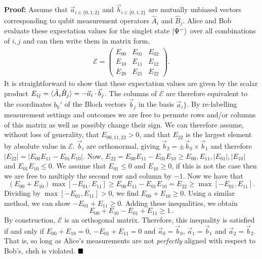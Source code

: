 \vspace{5mm}
\noindent\textbf{Proof:}
Assume that $\vec{a}_{i\in \{0,1,2\}}$ and $\vec{b}_{i\in \{0,1,2\}}$ are mutually unbiased vectors corresponding to qubit measurement operators $\hat{A}_i$ and $\hat{B}_j$. 
Alice and Bob evaluate these expectation values for the singlet state $\mbox{$ | \Psi^- \rangle $}$ over all combinations of $i, j$ and can then write them in matrix form,
\begin{eqnarray}
\label{matrix}
\mathcal{E} = \left(
\begin{array}{ccc}
E_{00} & E_{01} & E_{02} \\
E_{10} & E_{11} & E_{12} \\
E_{20} & E_{21} & E_{22}
\end{array}
\right).
\label{eqn:chsh-three-matrix}
\end{eqnarray}
It is straightforward to show that these expectation values are given by the scalar product $E_{ij} = \langle \hat{A}_i \hat{B}_j \rangle = -\vec{a}_i \cdot \vec{b}_j$.  
The columns of $\mathcal{E}$ are therefore equivalent to the coordinates $b_k'$ of the Bloch vectors $\vec{b}_j$ in the basis $\vec{a}_i\}$.  
By re-labelling measurement settings and outcomes we are free to permute rows and/or columns of this matrix as well as possibly change their sign. 
We can therefore assume, without loss of generality, that $E_{00, 11, 22} > 0$, and that $E_{22}$ is the largest element by absolute value in $\mathcal{E}$. 
$\vec{b}_i$ are orthonormal, giving 
$\vec{b}_2 = \pm \vec{b}_0 \times \vec{b}_1$ and therefore 
$|E_{22}| = |E_{00}E_{11} - E_{01}E_{10}|$.
Now, 
$E_{22} = E_{00} E_{11} - E_{01} E_{10}
\geq E_{00} , E_{11} , |E_{01}|, |E_{10}|$ 
and
$E_{01} E_{10} \leq 0$. 
We assume that $E_{01} \leq 0$ and $E_{10} \geq 0$, if this is not the case then we are free to multiply the second row and column by $-1$.  Now we have that
\begin{equation}
(E_{00} + E_{10}) \max[-E_{01},E_{11}] \geq E_{00} E_{11} - E_{01} E_{10} = E_{22} \geq \max[-E_{01},E_{11}].
\end{equation}
Dividing by $\max[-E_{01},E_{11}] > 0$, we find 
$E_{00} + E_{10} \geq 0$. Using a similar method, we can show 
$ -E_{01} + E_{11} \geq 0$.
Adding these inequalities, we obtain
\begin{equation}
E_{00} + E_{10} - E_{01} + E_{11} \geq 1 \,. \label{ineq_proof}
\end{equation}
By construction, $\mathcal{E}$ is an orthogonal matrix. Therefore, this inequality is satisfied if and only if 
$E_{00} + E_{10} = 0$, 
$-E_{01} + E_{11} = 0$ 
and 
$\vec{a}_0 = \vec{b}_0$, $\vec{a}_1 = \vec{b}_1$ and $\vec{a}_2 = \vec{b}_2$. That is, so long as Alice's measurements are not \emph{perfectly} aligned with respect to Bob's, \gls{chsh} is violated.
$\hfill\blacksquare$

